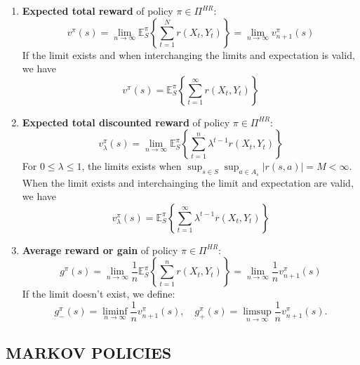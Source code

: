 \begin{enumerate}
    \item \textbf{Expected total reward} of policy $ \pi \in \Pi^{HR} $:
        \begin{equation}
            v^\pi(s) = \lim_{n \to \infty} \mathbb{E}^\pi_S \left\{ \sum^{N}_{t=1} r(X_t, Y_t) \right\} = \lim_{n \to \infty} v^\pi_{n+1}(s)
        \end{equation}
        If the limit exists and when interchanging the limits and expectation is valid, we have
        \begin{equation}
            v^\pi(s) = \mathbb{E}^\pi_S \left\{ \sum^{\infty}_{t=1} r(X_t, Y_t) \right\}
        \end{equation}

    \item \textbf{Expected total discounted reward} of policy $ \pi \in \Pi^{HR} $:
        \begin{equation}
            v^\pi_\lambda(s) = \lim_{n \to \infty} \mathbb{E}^\pi_S \left\{ \sum^{n}_{t=1} \lambda^{t-1} r(X_t, Y_t) \right\}
        \end{equation}
        For $ 0 \le \lambda \le 1 $, the limits exists when $ \sup_{s \in S} \sup_{a \in A_s} \left| r(s, a) \right| = M < \infty$. When the limit exists and interchainging the limit and expectation are valid, we have
        \begin{equation}
            v^\pi_\lambda(s) = \mathbb{E}^\pi_S \left\{ \sum^{\infty}_{t=1} \lambda^{t-1} r(X_t, Y_t) \right\}
        \end{equation}
    \item \textbf{Average reward or gain} of policy $ \pi \in \Pi^{HR} $:
        \begin{equation}
            g^\pi(s) = \lim_{n \to \infty} \frac{1}{n} \mathbb{E}^\pi_S \left\{ \sum^{n}_{t=1} r(X_t, Y_t) \right\} = \lim_{n \to \infty} \frac{1}{n} v^\pi_{n+1}(s)
        \end{equation}
        If the limit doesn't exist, we define:
        \[
            g^\pi_-(s) = \liminf_{n \rightarrow \infty} \frac{1}{n} v^\pi_{n+1}(s),\quad
            g^\pi_+(s) = \limsup_{n\rightarrow\infty} \frac{1}{n} v^\pi_{n+1}(s).
        \]
\end{enumerate}

\subsection{MARKOV POLICIES}%
\label{sub:markov_policies}

